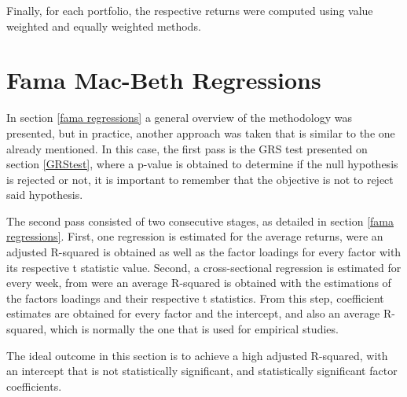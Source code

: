 Finally, for each portfolio, the respective returns were computed using value weighted and equally weighted methods.

\section{Fama Mac-Beth Regressions}
\label{c44}
In section \ref{fama regressions} a general overview of the methodology was presented, but in practice, another approach was taken that is similar to the one already mentioned. In this case, the first pass is the GRS test presented on section \ref{GRStest}, where a p-value is obtained to determine if the null hypothesis is rejected or not, it is important to remember that the objective is not to reject said hypothesis.

The second pass consisted of two consecutive stages, as detailed in section \ref{fama regressions}. First, one regression is estimated for the average returns, were an adjusted R-squared is obtained as well as the factor loadings for every factor with its respective t statistic value. Second, a cross-sectional regression is estimated for every week, from were an average R-squared is obtained with the estimations of the factors loadings and their respective t statistics. From this step, coefficient estimates are obtained for every factor and the intercept, and also an average R-squared, which is normally the one that is used for empirical studies.

The ideal outcome in this section is to achieve a high adjusted R-squared, with an intercept that is not statistically significant, and statistically significant factor coefficients.







 